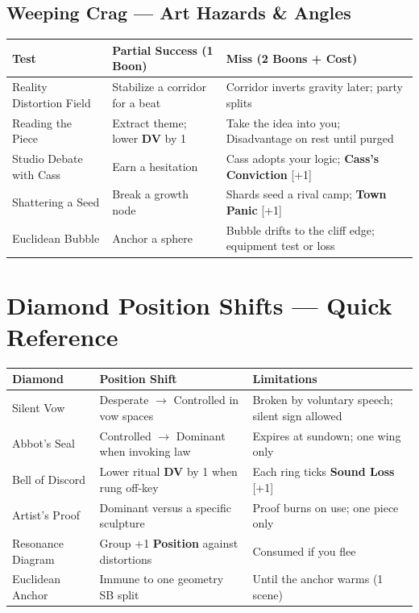 \documentclass[11pt]{article}
\newcommand{\Clock}[2]{\textbf{#1} [#2]}
\newcommand{\Term}[1]{\textbf{#1}}
\newcommand{\DV}{\Term{DV}}
\newcommand{\Position}{\Term{Position}}
\begin{document}
\subsection*{Weeping Crag --- Art Hazards \& Angles}
\begin{tabularx}{\linewidth}{@{}l X X@{}}
\toprule
\textbf{Test} & \textbf{Partial Success (1 Boon)} & \textbf{Miss (2 Boons + Cost)}\\
\midrule
Reality Distortion Field & Stabilize a corridor for a beat & Corridor inverts gravity later; party splits\\
Reading the Piece & Extract theme; lower \DV{} by 1 & Take the idea into you; Disadvantage on rest until purged\\
Studio Debate with Cass & Earn a hesitation & Cass adopts your logic; \Clock{Cass's Conviction}{+1}\\
Shattering a Seed & Break a growth node & Shards seed a rival camp; \Clock{Town Panic}{+1}\\
Euclidean Bubble & Anchor a sphere & Bubble drifts to the cliff edge; equipment test or loss\\
\bottomrule
\end{tabularx}

\section{Diamond Position Shifts --- Quick Reference}
\label{app:diamonds}
\begin{tabularx}{\linewidth}{@{}l l X@{}}
\toprule
\textbf{Diamond} & \textbf{Position Shift} & \textbf{Limitations}\\
\midrule
Silent Vow & Desperate $\rightarrow$ Controlled in vow spaces & Broken by voluntary speech; silent sign allowed\\
Abbot's Seal & Controlled $\rightarrow$ Dominant when invoking law & Expires at sundown; one wing only\\
Bell of Discord & Lower ritual \DV{} by 1 when rung off-key & Each ring ticks \Clock{Sound Loss}{+1}\\
Artist's Proof & Dominant versus a specific sculpture & Proof burns on use; one piece only\\
Resonance Diagram & Group +1 \Position{} against distortions & Consumed if you flee\\
Euclidean Anchor & Immune to one geometry SB split & Until the anchor warms (1 scene)\\
\bottomrule
\end{tabularx}
\end{document}
